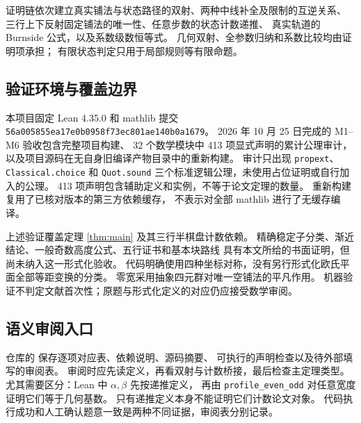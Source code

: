 证明链依次建立真实铺法与状态路径的双射、两种中线补全及限制的互逆关系、
三行上下反射固定铺法的唯一性、任意步数的状态计数递推、
真实轨道的 Burnside 公式，以及系数级数恒等式。
几何双射、全参数归纳和系数比较均由证明项承担；
有限状态判定只用于局部规则等有限命题。

\subsection{验证环境与覆盖边界}
本项目固定 Lean 4.35.0 和 mathlib 提交
\texttt{56a005855ea17e0b0958f73ec801ae140b0a1679}。
2026 年 10 月 25 日完成的 M1--M6 验收包含完整项目构建、
32 个数学模块中 413 项显式声明的累计公理审计，
以及项目源码在无自身旧编译产物目录中的重新构建。
审计只出现 \texttt{propext}、\texttt{Classical.choice} 和 \texttt{Quot.sound}
三个标准逻辑公理，未使用占位证明或自行加入的公理。
413 项声明包含辅助定义和实例，不等于论文定理的数量。
重新构建复用了已核对版本的第三方依赖缓存，
不表示对全部 mathlib 进行了无缓存编译。

上述验证覆盖定理 \ref{thm:main} 及其三行半棋盘计数依赖。
精确稳定子分类、渐近结论、一般奇数高度公式、五行证书和基本块路线
具有本文所给的书面证明，但尚未纳入这一形式化验收。
代码明确使用四种坐标对称，没有另行形式化欧氏平面全部等距变换的分类。
零宽采用抽象四元群对唯一空铺法的平凡作用。
机器验证不判定文献首次性；原题与形式化定义的对应仍应接受数学审阅。


\subsection{语义审阅入口}
仓库的  保存逐项对应表、依赖说明、源码摘要、
可执行的声明检查以及待外部填写的审阅表。
审阅时应先读定义，再看双射与计数桥接，最后检查主定理类型。
尤其需要区分：Lean 中 $\alpha,\beta$ 先按递推定义，
再由 \texttt{profile\_even\_odd} 对任意宽度证明它们等于几何基数。
只有递推定义本身不能证明它们计数论文对象。
代码执行成功和人工确认题意一致是两种不同证据，审阅表分别记录。
